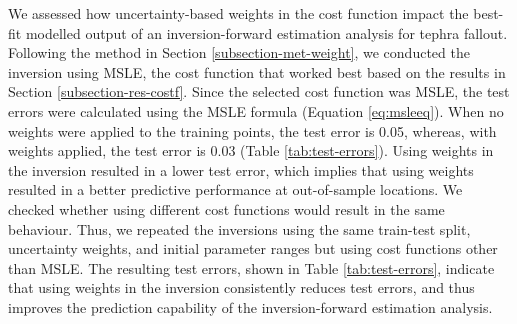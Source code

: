 \documentclass[a4paper,fleqn]{cas-sc}
\begin{document}
We assessed how uncertainty-based weights in the cost function impact the best-fit modelled output of an inversion-forward estimation analysis for tephra fallout. Following the method in Section \ref{subsection-met-weight}, we conducted the inversion using MSLE, the cost function that worked best based on the results in Section \ref{subsection-res-costf}. Since the selected cost function was MSLE, the test errors were calculated using the MSLE formula (Equation \ref{eq:msleeq}). When no weights were applied to the training points, the test error is 0.05, whereas, with weights applied, the test error is 0.03 (Table \ref{tab:test-errors}). Using weights in the inversion resulted in a lower test error, which implies that using weights resulted in a better predictive performance at out-of-sample locations. We checked whether using different cost functions would result in the same behaviour. Thus, we repeated the inversions using the same train-test split, uncertainty weights, and initial parameter ranges but using cost functions other than MSLE. The resulting test errors, shown in Table \ref{tab:test-errors}, indicate that using weights in the inversion consistently reduces test errors, and thus improves the prediction capability of the inversion-forward estimation analysis.
\end{document}
